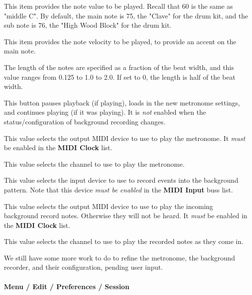    This item provides the note value to be played.  Recall that 60 is the same
   as "middle C".  By default, the main note is 75, the "Clave" for the drum
   kit, and the sub note is 76, the "High Wood Block" for the drum kit.

   This item provides the note velocity to be played, to provide an accent on
   the main note.

   The length of the notes are specified as a fraction of the beat width, and
   this value ranges from 0.125 to 1.0 to 2.0.
   If set to 0, the length is half of the beat width.

   This button pauses playback (if playing),
   loads in the new metronome settings, and
   continues playing (if it was playing).
   It is \textsl{not} enabled when the status/configuration of background
   recording changes.

   This value selects the output MIDI device to use to play the metronome.
   It \textsl{must} be enabled in the \textbf{MIDI Clock} list.

   This value selects the channel to use to play the metronome.

   This value selects the input device to use to record events into the
   background pattern.
   Note that this device \textsl{must be enabled} in the \textbf{MIDI Input}
   buss list.

   This value selects the output MIDI device to use to play the incoming
   background record notes.  Otherwise they will not be heard.
   It \textsl{must} be enabled in the \textbf{MIDI Clock} list.

   This value selects the channel to use to play the recorded notes as
   they come in.

   We still have some more work to do to refine the metronome, the
   background recorder, and their configuration, pending user input.

\paragraph{Menu / Edit / Preferences / Session}
\label{paragraph:menu_edit_preferences_session}

